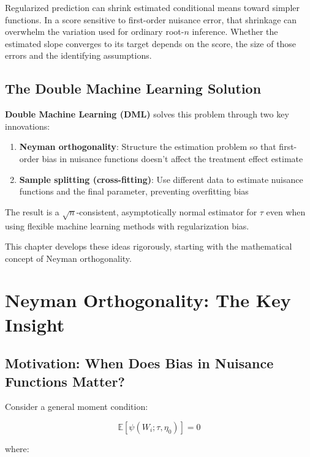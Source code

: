 Regularized prediction can shrink estimated conditional means toward simpler functions. In a score sensitive to first-order nuisance error, that shrinkage can overwhelm the variation used for ordinary root-\(n\) inference. Whether the estimated slope converges to its target depends on the score, the size of those errors and the identifying assumptions.

\subsection{The Double Machine Learning
Solution}\label{_the_double_machine_learning_solution}

\textbf{Double Machine Learning (DML)} solves this problem through two
key innovations:

\begin{enumerate}
\def\labelenumi{\arabic{enumi}.}
\item
  \textbf{Neyman orthogonality}: Structure the estimation problem so
  that first-order bias in nuisance functions doesn't affect the
  treatment effect estimate
\item
  \textbf{Sample splitting (cross-fitting)}: Use different data to
  estimate nuisance functions and the final parameter, preventing
  overfitting bias
\end{enumerate}

The result is a \(\sqrt{n}\)-consistent, asymptotically normal estimator
for \(\tau\) even when using flexible machine learning methods with
regularization bias.

This chapter develops these ideas rigorously, starting with the
mathematical concept of Neyman orthogonality.

\section{Neyman Orthogonality: The Key
Insight}\label{_neyman_orthogonality_the_key_insight}

\subsection{Motivation: When Does Bias in Nuisance Functions
Matter?}\label{_motivation_when_does_bias_in_nuisance_functions_matter}

Consider a general moment condition:

\[\mathbb{E}[\psi(W_i; \tau, \eta_0)] = 0\]

where:

